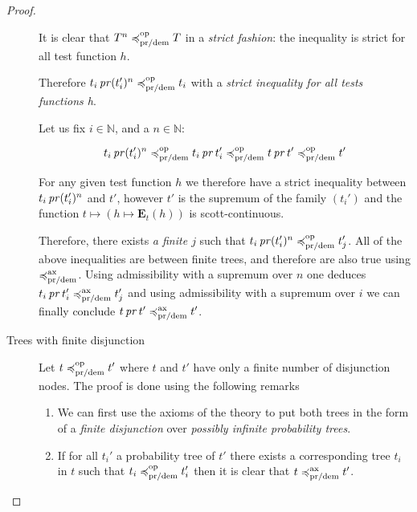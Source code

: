 \begin{proof}
\begin{description}
    It is clear that $T^n \preccurlyeq^{\text{op}}_{\text{pr/dem}} T$ in a \emph{strict fashion}:
    the inequality is strict for all test function $h$.

    Therefore $t_i \operatorname{\mathit{pr}} (t_i')^n \preccurlyeq^{\text{op}}_{\text{pr/dem}} t_i$
    with a \emph{strict inequality for all tests functions h}.
    
    Let us fix $i \in \mathbb{N}$, and a $n \in \mathbb{N}$: 

    \begin{equation*}
        t_i \operatorname{\mathit{pr}} (t_i')^n \preccurlyeq^{\text{op}}_{\text{pr/dem}} t_i \operatorname{\mathit{pr}} t_i'
        \preccurlyeq^{\text{op}}_{\text{pr/dem}} t \operatorname{\mathit{pr}} t' \preccurlyeq^{\text{op}}_{\text{pr/dem}} t'
    \end{equation*}

    For any given test function $h$ we therefore have a strict 
    inequality between $t_i \operatorname{\mathit{pr}} (t_i')^n$ and $t'$, however 
    $t'$ is the supremum of the family $(t_i')$ and the function 
    $ t \mapsto (h \mapsto \mathbf{E}_{ t } (h))$ is scott-continuous.

    Therefore, there exists \emph{a finite $j$} such that 
    $t_i \operatorname{\mathit{pr}} (t_i')^n \preccurlyeq^{\text{op}}_{\text{pr/dem}} t_j'$.
    All of the above inequalities are between finite trees, and 
    therefore are also true using $\preccurlyeq^{\text{ax}}_{\text{pr/dem}}$.
    Using admissibility with a supremum over $n$ 
    one deduces $t_i \operatorname{\mathit{pr}} t_i' \preccurlyeq^{\text{ax}}_{\text{pr/dem}} t_j'$
    and using admissibility with a supremum over $i$ we can finally conclude
    $t \operatorname{\mathit{pr}} t' \preccurlyeq^{\text{ax}}_{\text{pr/dem}} t'$.
    
      

        \item[Trees with finite disjunction]

    Let $t \preccurlyeq^{\text{op}}_{\text{pr/dem}} t'$ 
    where $t$ and $t'$ have only a finite number 
    of disjunction nodes.
    The proof is done using the following 
    remarks
    \begin{enumerate}
        \item We can first use the axioms of the theory 
            to put both trees in the form of 
            a \emph{finite disjunction} over 
            \emph{possibly infinite probability trees}.

        \item 
            If for all $t_i'$ 
            a probability
            tree of $t'$ there exists 
            a corresponding tree $t_i$ in $t$ 
            such that $t_i \preccurlyeq^{\text{op}}_{\text{pr/dem}} t_i'$
            then it is clear that $t \preccurlyeq^{\text{ax}}_{\text{pr/dem}} t'$.


\end{enumerate}
\end{description}
\end{proof}
